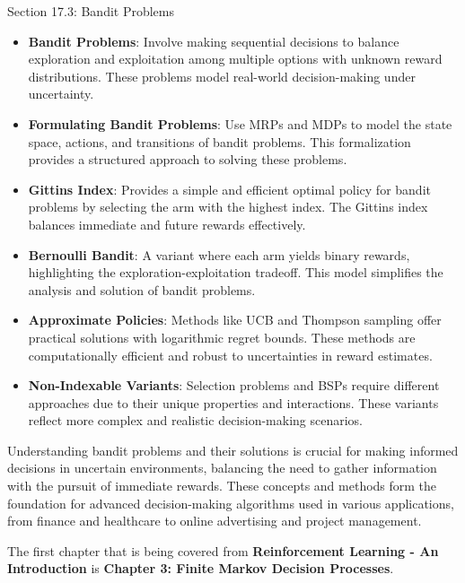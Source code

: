 \begin{notes}{Section 17.3: Bandit Problems}
\begin{highlight}
        \begin{itemize}
            \item \textbf{Bandit Problems}: Involve making sequential decisions to balance exploration and exploitation among multiple options with unknown reward distributions. These problems model 
            real-world decision-making under uncertainty.
            \item \textbf{Formulating Bandit Problems}: Use MRPs and MDPs to model the state space, actions, and transitions of bandit problems. This formalization provides a structured approach to 
            solving these problems.
            \item \textbf{Gittins Index}: Provides a simple and efficient optimal policy for bandit problems by selecting the arm with the highest index. The Gittins index balances immediate and 
            future rewards effectively.
            \item \textbf{Bernoulli Bandit}: A variant where each arm yields binary rewards, highlighting the exploration-exploitation tradeoff. This model simplifies the analysis and solution of 
            bandit problems.
            \item \textbf{Approximate Policies}: Methods like UCB and Thompson sampling offer practical solutions with logarithmic regret bounds. These methods are computationally efficient and robust 
            to uncertainties in reward estimates.
            \item \textbf{Non-Indexable Variants}: Selection problems and BSPs require different approaches due to their unique properties and interactions. These variants reflect more complex and 
            realistic decision-making scenarios.
        \end{itemize}
    
    Understanding bandit problems and their solutions is crucial for making informed decisions in uncertain environments, balancing the need to gather information with the pursuit of immediate rewards. 
    These concepts and methods form the foundation for advanced decision-making algorithms used in various applications, from finance and healthcare to online advertising and project management.
    
    \end{highlight}
\end{notes}

The first chapter that is being covered from \textbf{Reinforcement Learning - An Introduction} is \textbf{Chapter 3: Finite Markov Decision Processes}.

